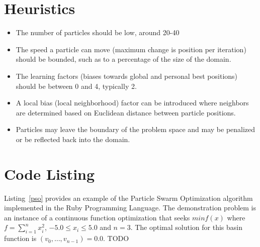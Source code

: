 \documentclass[a4paper, 11pt]{article}
\begin{document}
\section{Heuristics}
\label{sec:heuristics}
\begin{itemize}
	\item The number of particles should be low, around 20-40
	\item The speed a particle can move (maximum change is position per iteration) should be bounded, such as to a percentage of the size of the domain.
	\item The learning factors (biases towards global and personal best positions) should be between 0 and 4, typically 2.
	\item A local bias (local neighborhood) factor can be introduced where neighbors are determined based on Euclidean distance between particle positions.
	\item Particles may leave the boundary of the problem space and may be penalized or be reflected back into the domain. 
\end{itemize}

\section{Code Listing}
\label{sec:code}
Listing~\ref{pso} provides an example of the Particle Swarm Optimization algorithm implemented in the Ruby Programming Language. 
The demonstration problem is an instance of a continuous function optimization that seeks $min f(x)$ where $f=\sum_{i=1}^n x_{i}^2$, $-5.0\leq x_i \leq 5.0$ and $n=3$. The optimal solution for this basin function is $(v_0,\ldots,v_{n-1})=0.0$.
TODO
\end{document}
